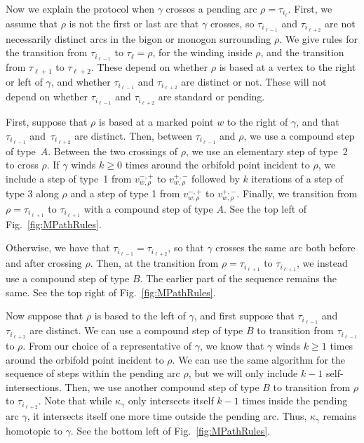 \documentclass[pdftex]{sigma}%
\numberwithin{equation}{section}
\begin{document}
Now we explain the protocol when $\gamma$ crosses a pending arc $\rho = \tau_{i_\ell}$. First, we assume that $\rho$ is not the first or last arc that $\gamma$ crosses, so $\tau_{i_{\ell-1}}$ and $\tau_{i_{\ell+2}}$ are not necessarily distinct arcs in the bigon or monogon surrounding $\rho$. We give rules for the transition from $\tau_{i_{\ell-1}}$ to $\tau_\ell = \rho$, for the winding inside $\rho$, and the transition from $\tau_{\ell+1}$ to $\tau_{\ell+2}$. These depend on whether $\rho$ is based at a vertex to the right or left of $\gamma$, and whether $\tau_{i_{\ell-1}}$ and $\tau_{i_{\ell+2}}$ are distinct or not. These will not depend on whether $\tau_{i_{\ell-1}}$ and $\tau_{i_{\ell+2}}$ are standard or pending.


First, suppose that $\rho$ is based at a marked point $w$ to the right of $\gamma$, and that~$\tau_{i_{\ell-1}}$ and~$\tau_{i_{\ell+2}}$ are distinct. Then, between $\tau_{i_{\ell-1}}$ and $\rho$, we use a compound step of type~$A$. Between the two crossings of $\rho$, we use an elementary step of type~2 to cross $\rho$. If $\gamma$ winds $k \geq 0$ times around the orbifold point incident to $\rho$, we include a step of type~1 from $v^{-,+}_{w,\rho}$ to $v^{+,-}_{w,\rho}$ followed by $k$ iterations of a step of type 3 along $\rho$ and a step of type 1 from $v^{-,+}_{w,\rho}$ to $v^{+,-}_{w,\rho}$. Finally, we transition from $\rho = \tau_{i_{\ell+1}}$ to $\tau_{i_{\ell+1}}$ with a compound step of type $A$. See the top left of Fig.~\ref{fig:MPathRules}.

Otherwise, we have that $\tau_{i_{\ell-1}} = \tau_{i_{\ell+2}}$, so that $\gamma$ crosses the same arc both before and after crossing $\rho$. Then, at the transition from $\rho = \tau_{i_{\ell+1}}$ to $\tau_{i_{\ell+1}}$, we instead use a compound step of type $B$. The earlier part of the sequence remains the same. See the top right of Fig.~\ref{fig:MPathRules}.

Now suppose that $\rho$ is based to the left of $\gamma$, and first suppose that $\tau_{i_{\ell-1}}$ and $\tau_{i_{\ell+2}}$ are distinct. We can use a compound step of type $B$ to transition from $\tau_{i_{\ell-1}}$ to $\rho$. From our choice of a representative of $\gamma$, we know that $\gamma$ winds $k \geq 1$ times around the orbifold point incident to $\rho$. We can use the same algorithm for the sequence of steps within the pending arc $\rho$, but we will only include $k-1$ self-intersections. Then, we use another compound step of type $B$ to transition from $\rho$ to $\tau_{i_{\ell+2}}$. Note that while $\kappa_\gamma$ only intersects itself $k-1$ times inside the pending arc $\gamma$, it intersects itself one more time outside the pending arc. Thus, $\kappa_\gamma$ remains homotopic to $\gamma$. See the bottom left of Fig.~\ref{fig:MPathRules}.
\end{document}
